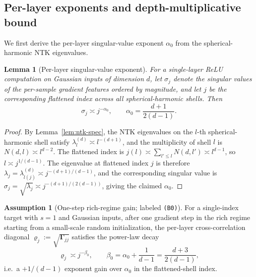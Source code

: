 \documentclass[12pt]{amsart}
\newtheorem{lemma}[theorem]{Lemma}
\theoremstyle{definition}
\newtheorem{assumption}[theorem]{Assumption}
\theoremstyle{remark}
\newcommand{\bGamma}{\boldsymbol{\Gamma}}
\begin{document}
\subsection{Per-layer exponents and depth-multiplicative bound}

We first derive the per-layer singular-value exponent $\alpha_{0}$ from
the spherical-harmonic NTK eigenvalues.

\begin{lemma}[Per-layer singular-value exponent]\label{lem:alpha0}
For a single-layer ReLU computation on Gaussian inputs of dimension $d$,
let $\sigma_{j}$ denote the singular values of the per-sample gradient
features ordered by magnitude, and let $j$ be the corresponding flattened
index across all spherical-harmonic shells. Then
\[
  \sigma_{j} \asymp j^{-\alpha_{0}}, \qquad
  \alpha_{0} = \frac{d+1}{2(d-1)}.
\]
\end{lemma}

\begin{proof}
By Lemma~\ref{lem:ntk-spec}, the NTK eigenvalues on the $l$-th
spherical-harmonic shell satisfy $\lambda_{l}^{(d)} \asymp l^{-(d+1)}$,
and the multiplicity of shell $l$ is
$N(d,l) \asymp l^{d-2}$. The flattened index is
$j(l) \asymp \sum_{l' \le l} N(d,l') \asymp l^{d-1}$, so $l \asymp j^{1/(d-1)}$.
The eigenvalue at flattened index $j$ is therefore
$\lambda_{j} = \lambda_{l(j)}^{(d)} \asymp j^{-(d+1)/(d-1)}$, and the
corresponding singular value is
$\sigma_{j} = \sqrt{\lambda_{j}} \asymp j^{-(d+1)/(2(d-1))}$,
giving the claimed $\alpha_{0}$.
\end{proof}

\begin{assumption}[One-step rich-regime gain;
labeled \texttt{(B0)}]\label{ass:beta0}
For a single-index target with $s=1$ and Gaussian inputs, after one
gradient step in the rich regime starting from a small-scale random
initialization, the per-layer cross-correlation diagonal
$\varrho_{j} := \sqrt{\bGamma_{jj}}$ satisfies the power-law decay
\[
  \varrho_{j} \asymp j^{-\beta_{0}}, \qquad
  \beta_{0} = \alpha_{0} + \frac{1}{d-1} = \frac{d+3}{2(d-1)},
\]
i.e.\ a $+1/(d-1)$ exponent gain over $\alpha_{0}$ in the
flattened-shell index.
\end{assumption}
\end{document}
